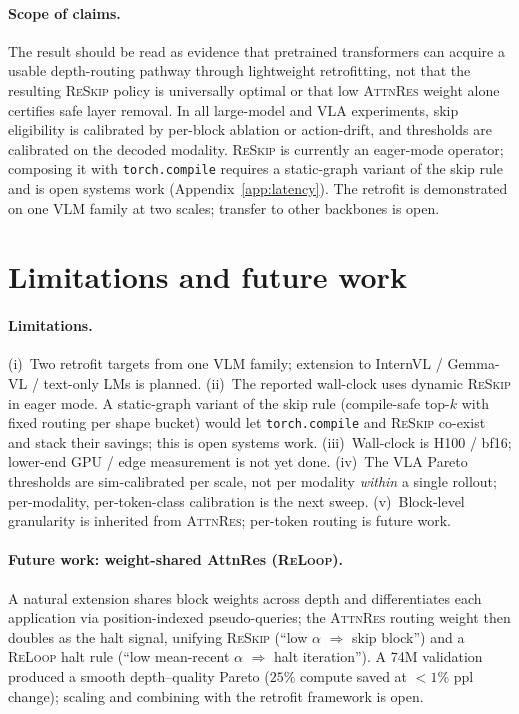 \documentclass{article}
\newcommand{\attnres}{\textsc{AttnRes}}
\newcommand{\reskip}{\textsc{ReSkip}}
\newcommand{\reloop}{\textsc{ReLoop}}
\begin{document}
\paragraph{Scope of claims.} The result should be read as evidence that pretrained transformers can acquire a usable depth-routing pathway through lightweight retrofitting, not that the resulting \reskip{} policy is universally optimal or that low \attnres{} weight alone certifies safe layer removal. In all large-model and VLA experiments, skip eligibility is calibrated by per-block ablation or action-drift, and thresholds are calibrated on the decoded modality. \reskip{} is currently an eager-mode operator; composing it with \texttt{torch.compile} requires a static-graph variant of the skip rule and is open systems work (Appendix~\ref{app:latency}). The retrofit is demonstrated on one VLM family at two scales; transfer to other backbones is open.



\appendix
\section{Limitations and future work}
\label{app:limitations}

\paragraph{Limitations.}
(i)~Two retrofit targets from one VLM family; extension to InternVL / Gemma-VL / text-only LMs is planned. (ii)~The reported wall-clock uses dynamic \reskip{} in eager mode. A static-graph variant of the skip rule (compile-safe top-$k$ with fixed routing per shape bucket) would let \texttt{torch.compile} and \reskip{} co-exist and stack their savings; this is open systems work. (iii)~Wall-clock is H100 / bf16; lower-end GPU / edge measurement is not yet done. (iv)~The VLA Pareto thresholds are sim-calibrated per scale, not per modality \emph{within} a single rollout; per-modality, per-token-class calibration is the next sweep. (v)~Block-level granularity is inherited from \attnres{}; per-token routing is future work.

\paragraph{Future work: weight-shared AttnRes (\reloop{}).}
A natural extension shares block weights across depth and differentiates each application via position-indexed pseudo-queries; the \attnres{} routing weight then doubles as the halt signal, unifying \reskip{} (``low $\alpha$ $\Rightarrow$ skip block'') and a \reloop{} halt rule (``low mean-recent $\alpha$ $\Rightarrow$ halt iteration''). A 74M validation produced a smooth depth--quality Pareto ($25\%$ compute saved at $<1\%$ ppl change); scaling and combining with the retrofit framework is open.
\end{document}

